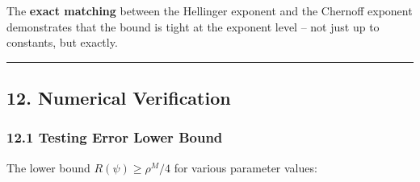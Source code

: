 \documentclass[
  12pt,
]{article}
\begin{document}
The \textbf{exact matching} between the Hellinger exponent and the
Chernoff exponent demonstrates that the bound is tight at the exponent
level -- not just up to constants, but exactly.

\begin{center}\rule{0.5\linewidth}{0.5pt}\end{center}

\subsection{12. Numerical Verification}\label{numerical-verification}

\subsubsection{12.1 Testing Error Lower
Bound}\label{testing-error-lower-bound}

The lower bound \(R(\psi) \geq \rho^M/4\) for various parameter values:
\end{document}
